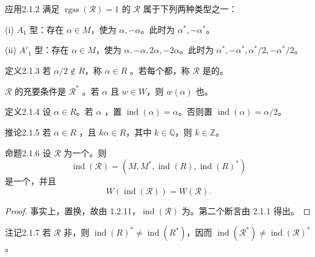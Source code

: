 \begin{SGAresult}{应用}{2.1.2}
满足 $\operatorname{rgss}(\mathscr R)=1$ 的 $\mathscr R$ 属于下列两种类型之一：

(i) $A_1$ 型：存在 $\alpha\in M$，使为 $\alpha,-\alpha$。此时为 $\alpha^*,-\alpha^*$。

(ii) $A'_1$ 型：存在 $\alpha\in M$，使为 $\alpha,-\alpha,2\alpha,-2\alpha$。此时为 $\alpha^*,-\alpha^*,\alpha^*/2,-\alpha^*/2$。
\end{SGAresult}
\begin{SGAresult}{定义}{2.1.3}
若 $\alpha/2\notin R$，称 $\alpha\in R$ 。若每个都，称 $\mathscr R$ 是的。

$\mathscr R$ 的充要条件是 $\mathscr R^*$ 。若 $\alpha$ 且 $w\in W$，则 $w(\alpha)$ 也。
\end{SGAresult}
\begin{SGAresult}{定义}{2.1.4}
设 $\alpha\in R$。若 $\alpha$ ，置 $\operatorname{ind}(\alpha)=\alpha$。否则置 $\operatorname{ind}(\alpha)=\alpha/2$。
\end{SGAresult}
\begin{SGAresult}{推论}{2.1.5}
若 $\alpha\in R$ ，且 $k\alpha\in R$，其中 $k\in\mathbb Q$，则 $k\in\mathbb Z$。
\end{SGAresult}
\begin{SGAresult}{命题}{2.1.6}
设 $\mathscr R$ 为一个。则
\[\operatorname{ind}(\mathscr R)=(M,M^*,\operatorname{ind}(R),\operatorname{ind}(R)^*)\]
是一个，并且
\[W(\operatorname{ind}(\mathscr R))=W(\mathscr R).\]
\end{SGAresult}
\begin{proof}
事实上，置换，故由 1.2.11，$\operatorname{ind}(\mathscr R)$ 为。第二个断言由 2.1.1 得出。
\end{proof}
\begin{SGAresult}{注记}{2.1.7}
若 $\mathscr R$ 非，则 $\operatorname{ind}(R)^*\ne\operatorname{ind}(R^*)$，因而 $\operatorname{ind}(\mathscr R^*)\ne\operatorname{ind}(\mathscr R)^*$。
\end{SGAresult}
